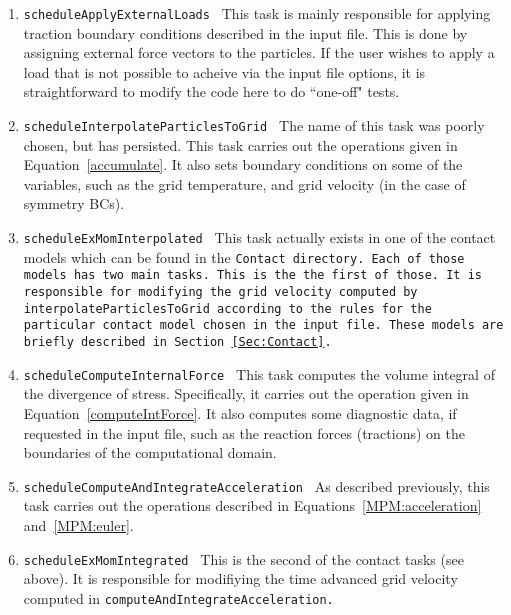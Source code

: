 \begin{enumerate}
\item {\tt scheduleApplyExternalLoads \normalfont} This task is mainly responsible for
applying traction boundary conditions described in the input file.  This is
done by assigning external force vectors to the particles.  If the user
wishes to apply a load that is not possible to acheive via the input file
options, it is straightforward to modify the code here to do ``one-off" tests.

\item {\tt scheduleInterpolateParticlesToGrid \normalfont}   The name of this task was
poorly chosen, but has persisted.  This task carries out the operations given
in Equation~\ref{accumulate}.  It also sets boundary conditions on some of
the variables, such as the grid temperature, and grid velocity 
(in the case of symmetry BCs).

\item {\tt scheduleExMomInterpolated \normalfont}  This task actually exists in one
of the contact models which can be found in the \tt Contact \normalfont directory.  Each of those
models has two main tasks. This is the the first of those. It is responsible
for modifying the grid velocity computed by interpolateParticlesToGrid according
to the rules for the particular contact model chosen in the input file.  These
models are briefly described in Section~\ref{Sec:Contact}. 

\item {\tt scheduleComputeInternalForce \normalfont} This task computes the volume
integral of the divergence of stress.  Specifically, it carries out the
operation given in Equation~\ref{computeIntForce}.  It also computes some
diagnostic data, if requested in the input file, such as the reaction forces
(tractions) on the boundaries of the computational domain.

\item {\tt scheduleComputeAndIntegrateAcceleration \normalfont} As described previously,
this task carries out the operations described in 
Equations~\ref{MPM:acceleration} and~\ref{MPM:euler}.

\item {\tt scheduleExMomIntegrated \normalfont}  This is the second of the contact tasks
(see above).  It is responsible for modifiying the time advanced grid velocity
computed in \tt computeAndIntegrateAcceleration. \normalfont


\end{enumerate}
